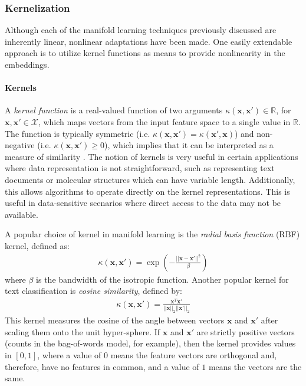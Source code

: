 \subsubsection{Kernelization} \label{sec:Kernels}
Although each of the manifold learning techniques previously discussed are inherently linear, nonlinear adaptations have been made.  One easily extendable approach is to utilize kernel functions as means to provide nonlinearity in the embeddings. 

\paragraph{Kernels} A \textit{kernel function} is a real-valued function of two arguments $\kappa(\bm{x},\bm{x}') \in \mathbb{R}$, for $\bm{x},\bm{x}' \in \mathcal{X}$, which maps vectors from the input feature space to a single value in $\mathbb{R}$.  The function is typically symmetric (i.e.  $\kappa(\bm{x},\bm{x}') =  \kappa(\bm{x}',\bm{x})$) and non-negative (i.e.  $\kappa(\bm{x},\bm{x}') \geq 0$), which implies that it can be interpreted as a measure of similarity \citep{Murphy2012}.  The notion of kernels is very useful in certain applications where data representation is not straightforward, such as representing text documents or molecular structures which can have variable length.  Additionally, this allows algorithms to operate directly on the kernel representations.  This is useful in data-sensitive scenarios where direct access to the data may not be available.

A popular choice of kernel in manifold learning is the \textit{radial basis function} (RBF) kernel, defined as:
\begin{align}
	\kappa(\bm{x},\bm{x}') = \exp \left( - \frac{|| \bm{x} - \bm{x}' ||^{2}}{\beta} \right)
\end{align}
\noindent
where $\beta$ is the bandwidth of the isotropic function.  Another popular kernel for text classification is \textit{cosine similarity}, defined by:
\begin{align}
	\kappa(\bm{x},\bm{x}') = \frac{\bm{x}^{T}\bm{x}'}{||\bm{x}||_{2}||\bm{x}'||_{2}} 
\end{align}
\noindent
This kernel measures the cosine of the angle between vectors $\bm{x}$ and  $\bm{x}'$ after scaling them onto the unit hyper-sphere.  If  $\bm{x}$ and  $\bm{x}'$ are strictly positive vectors (counts in the bag-of-words model, for example), then the kernel provides values in $[0,1]$, where a value of $0$ means the feature vectors are orthogonal and, therefore, have no features in common, and a value of $1$ means the vectors are the same. 

